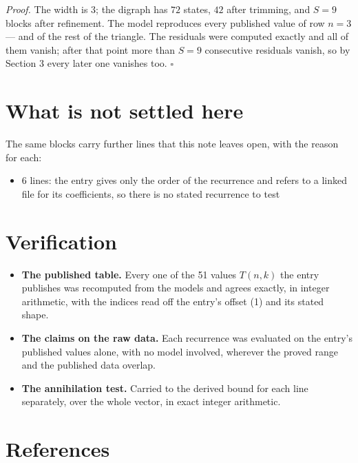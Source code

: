 \documentclass[11pt]{article}
\theoremstyle{definition}
\begin{document}
{\itshape Proof.} The width is $3$; the digraph has $72$ states, $42$ after trimming, and $S = 9$ blocks after refinement. The model reproduces every published value of row $n = 3$ --- and of the rest of the triangle. The residuals were computed exactly and all of them vanish; after that point more than $S = 9$ consecutive residuals vanish, so by Section 3 every later one vanishes too. $\square$

\section{What is not settled here}

The same blocks carry further lines that this note leaves open, with the reason for each:

\begin{itemize}

\item 6 lines: the entry gives only the order of the recurrence and refers to a linked file for its coefficients, so there is no stated recurrence to test

\end{itemize}

\section{Verification}

\begin{itemize}

\item {\bfseries The published table.} Every one of the 51 values $T(n,k)$ the entry publishes was recomputed from the models and agrees exactly, in integer arithmetic, with the indices read off the entry's offset (1) and its stated shape.

\item {\bfseries The claims on the raw data.} Each recurrence was evaluated on the entry's published values alone, with no model involved, wherever the proved range and the published data overlap.

\item {\bfseries The annihilation test.} Carried to the derived bound for each line separately, over the whole vector, in exact integer arithmetic.

\end{itemize}

\section{References}
\end{document}
